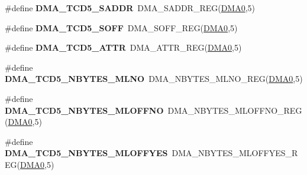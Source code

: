 \begin{DoxyCompactItemize}
\item 
\#define {\bfseries D\+M\+A\+\_\+\+T\+C\+D5\+\_\+\+S\+A\+D\+DR}~D\+M\+A\+\_\+\+S\+A\+D\+D\+R\+\_\+\+R\+EG(\hyperlink{group__DMA__Peripheral__Access__Layer_ga4103044f9ca209772f513dc694513ffb}{D\+M\+A0},5)\hypertarget{group__DMA__Register__Accessor__Macros_ga32c1585febc1f3f13c83d52b7a48d57e}{}\label{group__DMA__Register__Accessor__Macros_ga32c1585febc1f3f13c83d52b7a48d57e}

\item 
\#define {\bfseries D\+M\+A\+\_\+\+T\+C\+D5\+\_\+\+S\+O\+FF}~D\+M\+A\+\_\+\+S\+O\+F\+F\+\_\+\+R\+EG(\hyperlink{group__DMA__Peripheral__Access__Layer_ga4103044f9ca209772f513dc694513ffb}{D\+M\+A0},5)\hypertarget{group__DMA__Register__Accessor__Macros_ga299ca77e3ea01fa9a38285be053705e0}{}\label{group__DMA__Register__Accessor__Macros_ga299ca77e3ea01fa9a38285be053705e0}

\item 
\#define {\bfseries D\+M\+A\+\_\+\+T\+C\+D5\+\_\+\+A\+T\+TR}~D\+M\+A\+\_\+\+A\+T\+T\+R\+\_\+\+R\+EG(\hyperlink{group__DMA__Peripheral__Access__Layer_ga4103044f9ca209772f513dc694513ffb}{D\+M\+A0},5)\hypertarget{group__DMA__Register__Accessor__Macros_ga731feb22fa7733ad23173ed440d37836}{}\label{group__DMA__Register__Accessor__Macros_ga731feb22fa7733ad23173ed440d37836}

\item 
\#define {\bfseries D\+M\+A\+\_\+\+T\+C\+D5\+\_\+\+N\+B\+Y\+T\+E\+S\+\_\+\+M\+L\+NO}~D\+M\+A\+\_\+\+N\+B\+Y\+T\+E\+S\+\_\+\+M\+L\+N\+O\+\_\+\+R\+EG(\hyperlink{group__DMA__Peripheral__Access__Layer_ga4103044f9ca209772f513dc694513ffb}{D\+M\+A0},5)\hypertarget{group__DMA__Register__Accessor__Macros_gac5b5c66904988988e6cadca4fb8428f2}{}\label{group__DMA__Register__Accessor__Macros_gac5b5c66904988988e6cadca4fb8428f2}

\item 
\#define {\bfseries D\+M\+A\+\_\+\+T\+C\+D5\+\_\+\+N\+B\+Y\+T\+E\+S\+\_\+\+M\+L\+O\+F\+F\+NO}~D\+M\+A\+\_\+\+N\+B\+Y\+T\+E\+S\+\_\+\+M\+L\+O\+F\+F\+N\+O\+\_\+\+R\+EG(\hyperlink{group__DMA__Peripheral__Access__Layer_ga4103044f9ca209772f513dc694513ffb}{D\+M\+A0},5)\hypertarget{group__DMA__Register__Accessor__Macros_ga8751f24b9f2e3d213a219e5b42f9e642}{}\label{group__DMA__Register__Accessor__Macros_ga8751f24b9f2e3d213a219e5b42f9e642}

\item 
\#define {\bfseries D\+M\+A\+\_\+\+T\+C\+D5\+\_\+\+N\+B\+Y\+T\+E\+S\+\_\+\+M\+L\+O\+F\+F\+Y\+ES}~D\+M\+A\+\_\+\+N\+B\+Y\+T\+E\+S\+\_\+\+M\+L\+O\+F\+F\+Y\+E\+S\+\_\+\+R\+EG(\hyperlink{group__DMA__Peripheral__Access__Layer_ga4103044f9ca209772f513dc694513ffb}{D\+M\+A0},5)\hypertarget{group__DMA__Register__Accessor__Macros_ga2c2dc1bbc567fb9b81593ca3e926089b}{}\label{group__DMA__Register__Accessor__Macros_ga2c2dc1bbc567fb9b81593ca3e926089b}


\end{DoxyCompactItemize}
